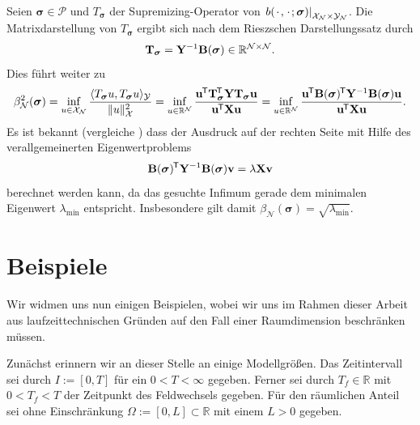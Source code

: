 \documentclass[../main.tex]{subfiles}
\begin{document}
Seien $\bm \sigma \in \mathcal P$ und $T_{\bm \sigma}$ der Supremizing-Operator von $\left.b({\mkern2mu\cdot\mkern2mu}, {\mkern2mu\cdot\mkern2mu}; \bm \sigma)\right|_{\mathcal X_{\mathcal N} \times \mathcal Y_{\mathcal N}}$.
Die Matrixdarstellung von $T_{\bm \sigma}$ ergibt sich nach dem Rieszschen Darstellungssatz durch
\begin{equation}
    \mathbf{T}_{\bm \sigma} = \mathbf{Y}^{-1} \mathbf{B}(\bm \sigma) \in \mathbb{R}^{\mathcal N \times \mathcal N}.
\end{equation}
Dies führt weiter zu
\begin{equation}
    \beta_{\mathcal N}^{2}(\bm \sigma)
    = \inf_{u \in \mathcal X_{\mathcal N}} \frac{\langle T_{\bm \sigma} u,T_{\bm \sigma} u\rangle_{\mathcal Y}}{\lVert u\rVert_{\mathcal X}^{2}}
    = \inf_{u \in \mathbb{R}^{\mathcal N}} \frac{\mathbf{u}^{\mkern-1.5mu\mathsf{T}} \mathbf{T}_{\bm \sigma}^{\mkern-1.5mu\mathsf{T}} \mathbf{Y} \mathbf{T}_{\bm \sigma} \mathbf{u}}{\mathbf{u}^{\mkern-1.5mu\mathsf{T}} \mathbf{X} \mathbf{u}}
    = \inf_{u \in \mathbb{R}^{\mathcal N}} \frac{\mathbf{u}^{\mkern-1.5mu\mathsf{T}} \mathbf{B}(\bm \sigma)^{\mkern-1.5mu\mathsf{T}} \mathbf{Y}^{-1} \mathbf{B}(\bm \sigma) \mathbf{u}}{\mathbf{u}^{\mkern-1.5mu\mathsf{T}} \mathbf{X} \mathbf{u}}.
\end{equation}
Es ist bekannt (vergleiche \cite[Subsection 1.3.5]{Patera:2007un}) dass der Ausdruck auf der rechten Seite mit Hilfe des verallgemeinerten Eigenwertproblems
\begin{equation}
    \mathbf{B}(\bm \sigma)^{\mkern-1.5mu\mathsf{T}} \mathbf{Y}^{-1} \mathbf{B}(\bm \sigma) \mathbf{v} = \lambda \mathbf{X} \mathbf{v}
\end{equation}
berechnet werden kann, da das gesuchte Infimum gerade dem minimalen Eigenwert $\lambda_{\min}$ entspricht.
Insbesondere gilt damit $\beta_{\mathcal N}(\bm \sigma) = \sqrt{\lambda_{\min}}$.


\section{Beispiele} %
\label{sec:cha4_galerkin:beispiele}

Wir widmen uns nun einigen Beispielen, wobei wir uns im Rahmen dieser Arbeit aus laufzeittechnischen Gründen auf den Fall einer Raumdimension beschränken müssen.

Zunächst erinnern wir an dieser Stelle an einige Modellgrößen.
Das Zeitintervall sei durch $I := [0, T]$ für ein $0 < T < \infty$ gegeben.
Ferner sei durch $T_{f} \in \mathbb{R}$ mit $0 < T_{f} < T$ der Zeitpunkt des Feldwechsels gegeben.
Für den räumlichen Anteil sei ohne Einschränkung $\Omega := [0, L] \subset \mathbb{R}$ mit einem $L > 0$ gegeben.
\end{document}
